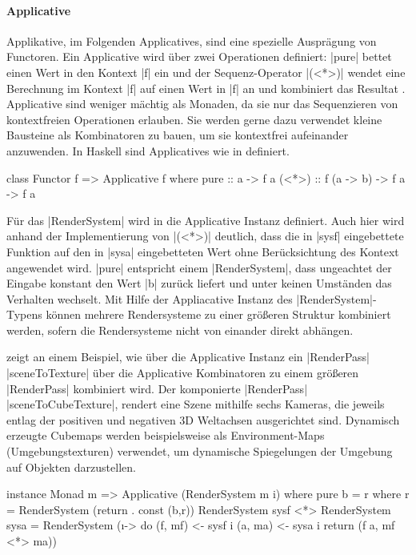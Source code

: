 \paragraph{Applicative}
Applikative, im Folgenden Applicatives, sind eine spezielle Ausprägung von Functoren. Ein Applicative wird über zwei Operationen definiert: |pure| bettet einen Wert in den Kontext |f| ein und der Sequenz-Operator |(<*>)| wendet eine Berechnung im Kontext |f| auf einen Wert in |f| an und kombiniert das Resultat \parencite[Kapitel~2]{Paterson2008}. Applicative sind weniger mächtig als Monaden, da sie nur das Sequenzieren von kontextfreien Operationen erlauben. Sie werden gerne dazu verwendet kleine Bausteine als Kombinatoren zu bauen, um sie kontextfrei aufeinander anzuwenden. In Haskell sind Applicatives wie in  definiert.

\begin{haskell}[label={lst:class-applicative},caption={Applicative Klasse\protect\footnotemark},nolol]
class Functor f => Applicative f where
  pure :: a -> f a
  (<*>) :: f (a -> b) -> f a -> f a
\end{haskell}

Für das |RenderSystem| wird in  die Applicative Instanz definiert. Auch hier wird anhand der Implementierung von |(<*>)| deutlich, dass die in |sysf| eingebettete Funktion auf den in |sysa| eingebetteten Wert ohne Berücksichtung des Kontext angewendet wird. |pure| entspricht einem |RenderSystem|, dass ungeachtet der Eingabe konstant den Wert |b| zurück liefert und unter keinen Umständen das Verhalten wechselt. Mit Hilfe der Appliacative Instanz des |RenderSystem|-Typens können mehrere Rendersysteme zu einer größeren Struktur kombiniert werden, sofern die Rendersysteme nicht von einander direkt abhängen.

 zeigt an einem Beispiel, wie über die Applicative Instanz ein |RenderPass| |sceneToTexture|  über die Applicative Kombinatoren zu einem größeren |RenderPass| kombiniert wird. Der komponierte |RenderPass| |sceneToCubeTexture|, rendert eine Szene mithilfe sechs Kameras, die jeweils entlag der positiven und negativen 3D Weltachsen ausgerichtet sind. Dynamisch erzeugte Cubemaps werden beispielsweise als Environment-Maps (Umgebungstexturen) verwendet, um dynamische Spiegelungen der Umgebung auf Objekten darzustellen.

\begin{haskell}[label={lst:rendersystem-applicative},caption={Applicative Instanz für RenderSystem}]
instance Monad m => Applicative (RenderSystem m i) where
  pure b = r where r = RenderSystem (return . const (b,r))
  RenderSystem sysf <*> RenderSystem sysa = RenderSystem (\i -> do
    (f, mf) <- sysf i
    (a, ma) <- sysa i
    return (f a, mf <*> ma))
\end{haskell}

